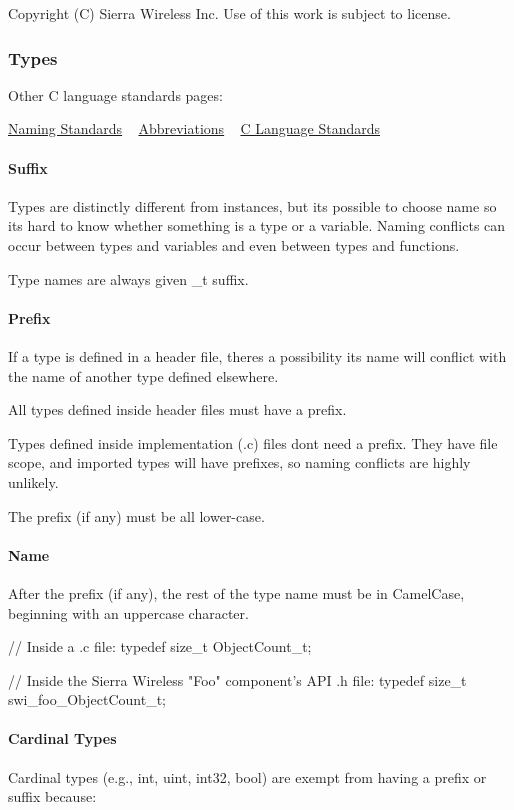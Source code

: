 Copyright (C) Sierra Wireless Inc. Use of this work is subject to license. \hypertarget{ccodingStdsNameTypes}{}\subsubsection{Types}\label{ccodingStdsNameTypes}
Other C language standards\textquotesingle{} pages\+:

\hyperlink{ccodingStdsNaming}{Naming Standards} ~\newline
 \hyperlink{ccodingStdsAbbr}{Abbreviations} ~\newline
 \hyperlink{ccodingStdsMain}{C Language Standards}\hypertarget{ccoding_stds_name_types_cstdsNameSuffix}{}\paragraph{Suffix}\label{ccoding_stds_name_types_cstdsNameSuffix}
Types are distinctly different from instances, but it\textquotesingle{}s possible to choose name so it\textquotesingle{}s hard to know whether something is a type or a variable. Naming conflicts can occur between types and variables and even between types and functions.

Type names are always given {\ttfamily \+\_\+t} suffix.\hypertarget{ccoding_stds_name_types_cstdsNameTypesPrefix}{}\paragraph{Prefix}\label{ccoding_stds_name_types_cstdsNameTypesPrefix}
If a type is defined in a header file, there\textquotesingle{}s a possibility its name will conflict with the name of another type defined elsewhere.

All types defined inside header files must have a prefix.

Types defined inside implementation (.c) files don\textquotesingle{}t need a prefix. They have file scope, and imported types will have prefixes, so naming conflicts are highly unlikely.

The prefix (if any) must be all lower-\/case.\hypertarget{ccoding_stds_name_types_cstdsNameType}{}\paragraph{Name}\label{ccoding_stds_name_types_cstdsNameType}
After the prefix (if any), the rest of the type name must be in Camel\+Case, beginning with an uppercase character. \begin{DoxyVerb}// Inside a .c file:
typedef size_t ObjectCount_t;



// Inside the Sierra Wireless "Foo" component's API .h file:
typedef size_t swi_foo_ObjectCount_t;\end{DoxyVerb}
\hypertarget{ccoding_stds_name_types_cstdsCardinalTypes}{}\paragraph{Cardinal Types}\label{ccoding_stds_name_types_cstdsCardinalTypes}
Cardinal types (e.\+g., int, uint, int32, bool) are exempt from having a prefix or suffix because\+:


